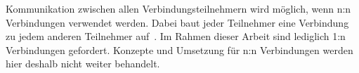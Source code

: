 Kommunikation zwischen allen Verbindungsteilnehmern wird möglich, wenn n:n Verbindungen verwendet werden.
Dabei baut jeder Teilnehmer eine Verbindung zu jedem anderen Teilnehmer auf~\cite{webrtc_mesh}.
Im Rahmen dieser Arbeit sind lediglich 1:n Verbindungen gefordert.
Konzepte und Umsetzung für n:n Verbindungen werden hier deshalb nicht weiter behandelt.

\clearpage
